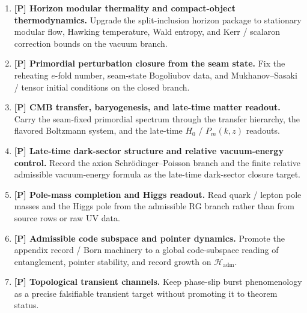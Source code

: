 \documentclass[11pt,a4paper]{article}
\theoremstyle{definition}
\theoremstyle{remark}
\begin{document}
\begin{tcolorbox}[colback=tfptblue!2, colframe=tfptblue!40, breakable,
    title={Extended downstream closure surface}, colbacktitle=tfptblue!60]
\begin{enumerate}[leftmargin=1.5em, topsep=3pt, itemsep=4pt]
    \item \textbf{[P] Horizon modular thermality and compact-object thermodynamics.} Upgrade the split-inclusion horizon package to stationary modular flow, Hawking temperature, Wald entropy, and Kerr / scalaron correction bounds on the vacuum branch.
    \item \textbf{[P] Primordial perturbation closure from the seam state.} Fix the reheating $e$-fold number, seam-state Bogoliubov data, and Mukhanov--Sasaki / tensor initial conditions on the closed branch.
    \item \textbf{[P] CMB transfer, baryogenesis, and late-time matter readout.} Carry the seam-fixed primordial spectrum through the transfer hierarchy, the flavored Boltzmann system, and the late-time $H_0$ / $P_m(k,z)$ readouts.
    \item \textbf{[P] Late-time dark-sector structure and relative vacuum-energy control.} Record the axion Schr\"odinger--Poisson branch and the finite relative admissible vacuum-energy formula as the late-time dark-sector closure target.
    \item \textbf{[P] Pole-mass completion and Higgs readout.} Read quark / lepton pole masses and the Higgs pole from the admissible RG branch rather than from source rows or raw UV data.
    \item \textbf{[P] Admissible code subspace and pointer dynamics.} Promote the appendix record / Born machinery to a global code-subspace reading of entanglement, pointer stability, and record growth on $\mathcal H_{\mathrm{adm}}$.
    \item \textbf{[P] Topological transient channels.} Keep phase-slip burst phenomenology as a precise falsifiable transient target without promoting it to theorem status.
\end{enumerate}
\end{tcolorbox}
\end{document}
